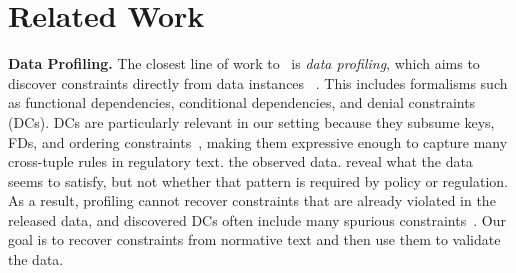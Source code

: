 \section{Related Work}
\label{sec:related}

\noindent\textbf{Data Profiling.}
The closest line of work to \system\ is \emph{data profiling}, which aims to discover constraints directly from data instances~\DIFdelbegin %
\DIFdelend \DIFaddbegin \cite{profSurveyFelix2015,Huhtala1998TANE,Fan2009DiscoverCFD,Papenbrock2016HyFD,Bleifuss2017Hydra,chu2013discovering,Pena2022FastDC,icdePena2024}\DIFaddend . This includes formalisms such as functional dependencies, conditional dependencies, and denial constraints (DCs). DCs are particularly relevant in our setting because they subsume keys, FDs, and ordering constraints~\cite{chu2013discovering}, making them expressive enough to capture many cross-tuple rules in regulatory text. \DIFdelbegin {}\DIFdelend \DIFaddbegin {}\cite{Pena2019DiscoveryDC,martin2026lima}\cite{fan2023topk}\cite{biester2024llmclean,glock2026ledqer,li2026lcats}\DIFaddend the observed data. \DIFdelbegin {}\DIFdelend \DIFaddbegin {}\DIFaddend reveal what the data seems to satisfy, but not whether that pattern is \DIFdelbegin {}\DIFdelend required by policy or regulation. As a result, profiling cannot recover constraints that are already violated in the released data, and \DIFdelbegin {}\DIFdelend discovered DCs often include many spurious constraints~\cite{martin2025false}. Our goal is to recover constraints from normative text and then use them to validate the data.

